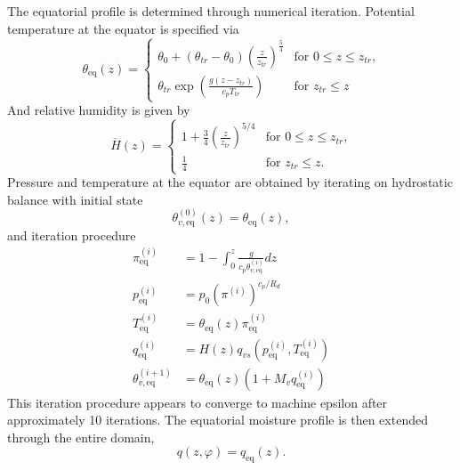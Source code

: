 \documentclass[times,doublespace]{fldauth}
\begin{document}
{The equatorial profile is determined through numerical iteration.  Potential temperature at the equator is specified via
\begin{equation}
\theta_{\text{eq}}(z) = \left\{ \begin{array}{ll} \displaystyle \theta_0 + (\theta_{tr} - \theta_0)\left(\frac{z}{z_{tr}}\right)^{\frac{5}{4}}  & \mbox{for $0 \leq z \leq z_{tr}$,} \\[2.0ex]
\displaystyle \theta_{tr} \exp\left(\frac{g(z-z_{tr})}{c_pT_{tr}}\right) & \mbox{for $z_{tr} \leq z$} \end{array} \right.
\end{equation}  And relative humidity is given by
\begin{equation}
\overline{H}(z) = \left\{ \begin{array}{ll} \displaystyle 1 + \frac{3}{4}\left(\frac{z}{z_{tr}}\right)^{5/4} & \mbox{for $0 \leq z \leq z_{tr}$,} \\[2.0ex]
\displaystyle \frac{1}{4} & \mbox{for $z_{tr} \leq z$.} \end{array} \right.
\end{equation}  Pressure and temperature at the equator are obtained by iterating on hydrostatic balance  with initial state
\begin{equation}
\theta_{v,\text{eq}}^{(0)}(z) = \theta_{\text{eq}}(z),
\end{equation} and iteration procedure
\begin{align}
\pi_{\text{eq}}^{(i)} &= 1 - \int_{0}^{z} \frac{g}{c_p \theta_{v,\text{eq}}^{(i)}} dz \\
p_{\text{eq}}^{(i)} &= p_0 (\pi^{(i)})^{c_p / R_d} \\
T_{\text{eq}}^{(i)} &= \theta_{\text{eq}}(z) \pi_{\text{eq}}^{(i)} \\
q^{(i)}_{\text{eq}} &= H(z) q_{vs}(p_{\text{eq}}^{(i)}, T_{\text{eq}}^{(i)}) \\
\theta_{v,\text{eq}}^{(i+1)} &= \theta_{\text{eq}}(z) (1 + M_v q^{(i)}_{\text{eq}})
\end{align}  This iteration procedure appears to converge to machine epsilon after approximately 10 iterations.  The equatorial moisture profile is then extended through the entire domain,
\begin{equation}
q(z, \varphi) = q_{\text{eq}}(z).
\end{equation}

}
\end{document}
